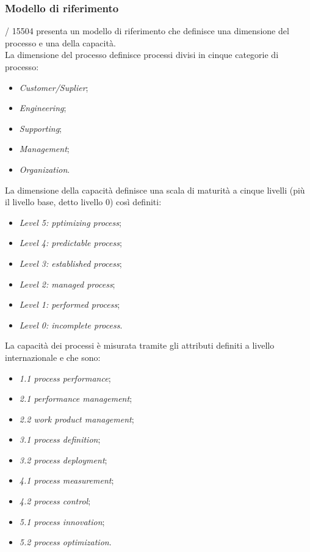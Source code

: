   \subsubsection{Modello di riferimento}
  / 15504 presenta un modello di riferimento che definisce una dimensione del processo e una della capacità.\\
  La dimensione del processo definisce processi divisi in cinque categorie di processo:
  \begin{itemize}
    \item \emph{Customer/Suplier};
    \item \emph{Engineering};
    \item \emph{Supporting};
    \item \emph{Management};
    \item \emph{Organization}.
  \end{itemize}
  La dimensione della capacità definisce una scala di maturità a cinque livelli (più il livello base, detto livello 0) così definiti:
  \begin{itemize}
    \item \emph{Level 5: pptimizing process};
    \item \emph{Level 4: predictable process};
    \item \emph{Level 3: established process};
    \item \emph{Level 2: managed process};
    \item \emph{Level 1: performed process};
    \item \emph{Level 0: incomplete process}.
  \end{itemize}
  La capacità dei processi è misurata tramite gli attributi definiti a livello internazionale e che sono:
  \begin{itemize}
    \item \emph{1.1 process performance};
    \item \emph{2.1 performance management};
    \item \emph{2.2 work product management};
    \item \emph{3.1 process definition};
    \item \emph{3.2 process deployment};
    \item \emph{4.1 process measurement};
    \item \emph{4.2 process control};
    \item \emph{5.1 process innovation};
    \item \emph{5.2 process optimization}.
  \end{itemize}
